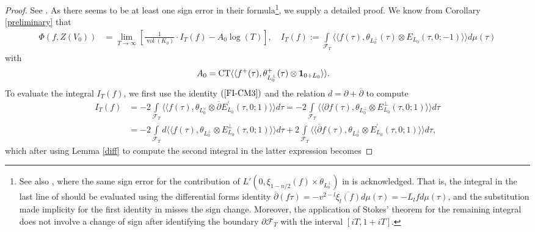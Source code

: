 \documentclass{amsart}
\theoremstyle{definition}
\theoremstyle{definition}
\theoremstyle{definition}
\begin{document}
\begin{proof}

See \cite[Theorem 4.7]{BY}. As there seems to be at least one sign error in their 
formula\footnote{See also \cite[Theorem 5.7.1]{AGHMP}, where the same sign error 
for the contribution of $L'(0, \xi_{1-n/2}(f) \times \theta_{L_0^{\perp}})$ in \cite[Theorem 4.7]{BY} 
is acknowledged. That is, the integral in the last line of \cite[p.~654]{BY} should be evaluated
using the differential forms identity $\overline{\partial}(f \tau) = - v^{2-l} \overline{\xi_l(f)} d \mu(\tau) = - L_l fd \mu(\tau)$,
and the substitution made implicity for the first identity in \cite[p.~655]{BY} misses the sign change. 
Moreover, the application of Stokes' theorem for the remaining integral does not involve a change of 
sign after identifying the boundary $\partial \mathcal{F}_T$ with the interval $[iT, 1 + iT]$.}, we supply a detailed proof. 
We know from Corollary \ref{preliminary} that  
\begin{align*} \Phi(f, Z(V_0)) &= \lim_{T \rightarrow \infty} \left[ \frac{1}{\operatorname{vol}(K_0)} \cdot I_T(f) - A_0 \log(T) \right], 
\quad I_T(f) := \int\limits_{\mathcal{F}_T} \langle \langle f(\tau), \theta_{L_0^{\perp}}(\tau) \otimes E_{L_0}(\tau, 0; -1) \rangle \rangle  d \mu (\tau) \end{align*}
with
\begin{align*} A_0 &= \operatorname{CT} \langle \langle f ^+(\tau), \theta_{L_0^{\perp}}^+(\tau) \otimes {\bf{1}}_{0 + L_0} \rangle \rangle.\end{align*}
To evaluate the integral $I_T(f)$, we first use the identity $(\ref{FI-CM3})$ and the relation $d = \partial + \overline{\partial}$ to compute 
\begin{align*} I_T(f) &= -2 \int\limits_{\mathcal{F}_T} \langle \langle f(\tau), \theta_{L_0^{\vee}} 
\otimes \overline{\partial} E_{L_0}^{\prime}(\tau, 0; 1) \rangle \rangle d \tau 
= -2 \int\limits_{\mathcal{F}_T} \langle \langle \partial f(\tau), \theta_{L_0^{\perp}} 
\otimes E_{L_0}^{\perp}(\tau, 0; 1) \rangle \rangle d \tau \\
&= -2 \int\limits_{\mathcal{F}_T} d \langle \langle f(\tau), \theta_{L_0^{\perp}} 
\otimes E_{L_0}^{\perp}(\tau, 0; 1) \rangle \rangle d \tau 
+ 2 \int\limits_{\mathcal{F}_T} \langle \langle \overline{\partial} f(\tau), \theta_{L_0^{\perp}} 
\otimes E_{L_0}^{\prime}(\tau, 0; 1) \rangle \rangle d \tau, \end{align*}
which after using Lemma \ref{diff} to compute the second integral in the latter expression becomes 

\end{proof}
\end{document}
